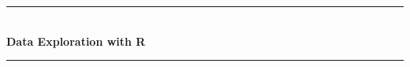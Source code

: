 \documentclass[12pt]{book}\usepackage{knitr}
\begin{document}

\begin{titlepage}

\newcommand{\HRule}{\rule{\linewidth}{0.5mm}} %

\center %
 


\HRule \\[0.4cm]
{ \Huge \bfseries Data Exploration with R}\\[0.2cm]
\HRule \\[1.5cm]
 

\end{titlepage}
\end{document}
